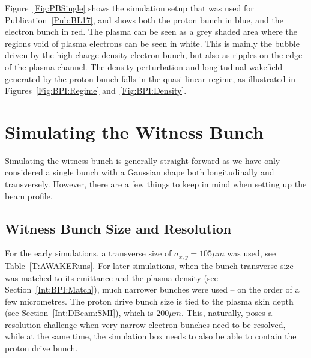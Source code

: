 Figure~\ref{Fig:PBSingle} shows the simulation setup that was used for Publication~\ref{Pub:BL17}, and shows both the proton bunch in blue, and the electron bunch in red.
The plasma can be seen as a grey shaded area where the regions void of plasma electrons can be seen in white.
This is mainly the bubble driven by the high charge density electron bunch, but also as ripples on the edge of the plasma channel.
The density perturbation and longitudinal wakefield generated by the proton bunch falls in the quasi-linear regime, as illustrated in Figures~\ref{Fig:BPI:Regime} and~\ref{Fig:BPI:Density}.

\section{Simulating the Witness Bunch}
\label{Sim:EBeam}

Simulating the witness bunch is generally straight forward as we have only considered a single bunch with a Gaussian shape both longitudinally and transversely.
However, there are a few things to keep in mind when setting up the beam profile.

\subsection{Witness Bunch Size and Resolution}
\label{Sim:EBeam:SizeRes}

For the early simulations, a transverse size of $\sigma_{x,y}=105\unit{\mu m}$ was used, see Table~\ref{T:AWAKERuns}.
For later simulations, when the bunch transverse size was matched to its emittance and the plasma density (see Section~\ref{Int:BPI:Match}), much narrower bunches were used -- on the order of a few micrometres.
The proton drive bunch size is tied to the plasma skin depth (see Section~\ref{Int:DBeam:SMI}), which is $200\unit{\mu m}$.
This, naturally, poses a resolution challenge when very narrow electron bunches need to be resolved, while at the same time, the simulation box needs to also be able to contain the proton drive bunch.

